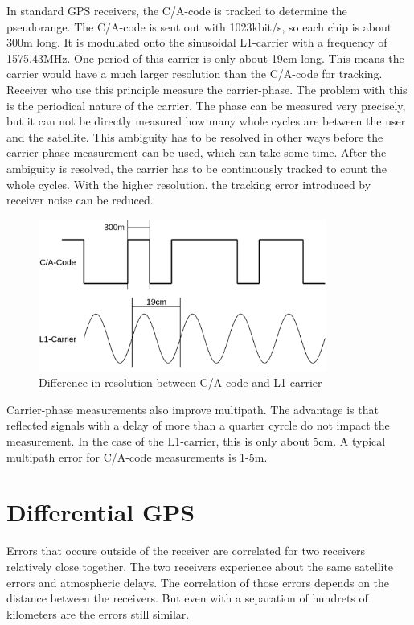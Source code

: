 In standard GPS receivers, the C/A-code is tracked to determine the pseudorange.
The C/A-code is sent out with 1023kbit/s, so each chip is about 300m long.
It is modulated onto the sinusoidal L1-carrier with a frequency of 1575.43MHz.
One period of this carrier is only about 19cm long.
This means the carrier would have a much larger resolution than the C/A-code for tracking.
Receiver who use this principle measure the carrier-phase.
The problem with this is the periodical nature of the carrier.
The phase can be measured very precisely, but it can not be directly measured how many whole cycles are between the user and the satellite.
This ambiguity has to be resolved in other ways before the carrier-phase measurement can be used, which can take some time.
After the ambiguity is resolved, the carrier has to be continuously tracked to count the whole cycles.
With the higher resolution, the tracking error introduced by receiver noise can be reduced.

\begin{figure}[ht]
 \centering
 \includegraphics[height=5cm]{images/Carrier-Phase_Measurement.png}
 \caption{Difference in resolution between C/A-code and L1-carrier}
 \label{fig:carrier_phase}
\end{figure}

Carrier-phase measurements also improve multipath.
The advantage is that reflected signals with a delay of more than a quarter cyrcle do not impact the measurement.
In the case of the L1-carrier, this is only about 5cm.
A typical multipath error for C/A-code measurements is 1-5m.


\section{Differential GPS}

Errors that occure outside of the receiver are correlated for two receivers relatively close together.
The two receivers experience about the same satellite errors and atmospheric delays.
The correlation of those errors depends on the distance between the receivers.
But even with a separation of hundrets of kilometers are the errors still similar.

